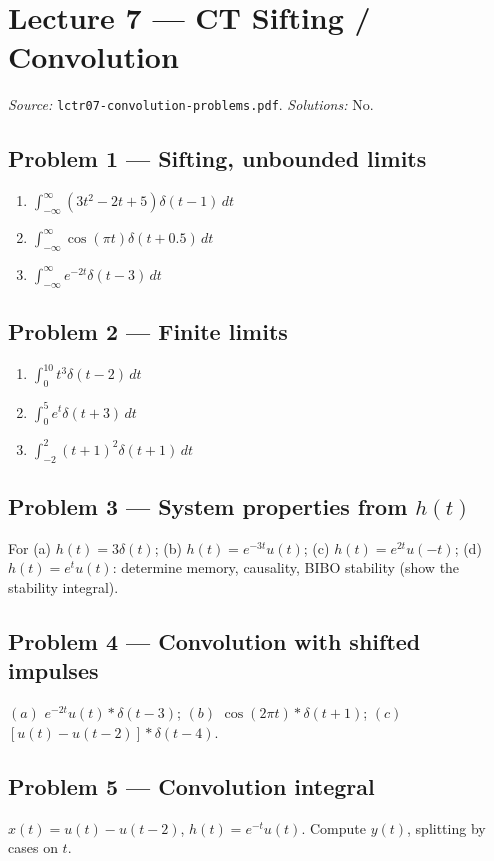 \documentclass[11pt]{article}
\begin{document}
\section{Lecture 7 --- CT Sifting / Convolution}
\emph{Source:} \texttt{lctr07-convolution-problems.pdf}. \emph{Solutions:} No.

\subsection{Problem 1 --- Sifting, unbounded limits}
\begin{enumerate}[label=(\alph*)]
  \item $\int_{-\infty}^{\infty}(3t^2-2t+5)\delta(t-1)\,dt$
  \item $\int_{-\infty}^{\infty}\cos(\pi t)\delta(t+0.5)\,dt$
  \item $\int_{-\infty}^{\infty}e^{-2t}\delta(t-3)\,dt$
\end{enumerate}

\subsection{Problem 2 --- Finite limits}
\begin{enumerate}[label=(\alph*)]
  \item $\int_0^{10}t^3\delta(t-2)\,dt$
  \item $\int_0^{5}e^{t}\delta(t+3)\,dt$
  \item $\int_{-2}^{2}(t+1)^2\delta(t+1)\,dt$
\end{enumerate}

\subsection{Problem 3 --- System properties from $h(t)$}
For (a) $h(t)=3\delta(t)$; (b) $h(t)=e^{-3t}u(t)$; (c) $h(t)=e^{2t}u(-t)$; (d) $h(t)=e^{t}u(t)$: determine memory, causality, BIBO stability (show the stability integral).

\subsection{Problem 4 --- Convolution with shifted impulses}
$(a)$ $e^{-2t}u(t) * \delta(t-3)$; $(b)$ $\cos(2\pi t) * \delta(t+1)$; $(c)$ $[u(t)-u(t-2)] * \delta(t-4)$.

\subsection{Problem 5 --- Convolution integral}
$x(t) = u(t)-u(t-2)$, $h(t) = e^{-t}u(t)$. Compute $y(t)$, splitting by cases on $t$.
\end{document}
